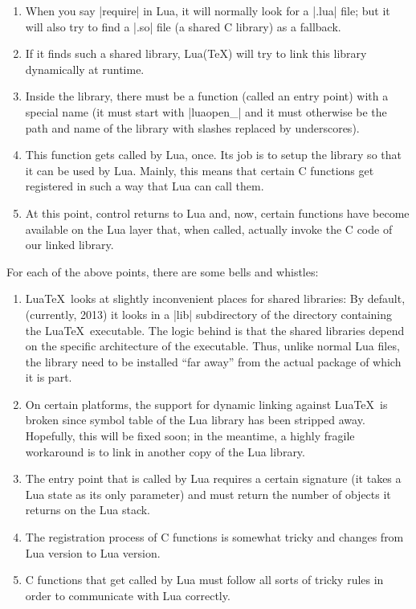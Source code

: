 \begin{enumerate}
\item When you say |require| in Lua, it will normally look for a
  |.lua| file; but it will also try to find a |.so| file (a shared C
  library) as a fallback.
\item If it finds such a shared library, Lua(\TeX) will try to link
  this library dynamically at runtime.
\item Inside the library, there must be a function (called an entry
  point) with a special name (it must start with |luaopen_| and it
  must otherwise be the path and name of the library with slashes replaced by
  underscores).
\item This function gets called by Lua, once. Its job is to setup the
  library so that it can be used by Lua. Mainly, this means that
  certain C functions get registered in such a way that Lua can call
  them.
\item At this point, control returns to Lua and, now, certain
  functions have become available on the Lua layer that, when called,
  actually invoke the C code of our linked library.
\end{enumerate}

For each of the above points, there are some bells and whistles:

\begin{enumerate}
\item Lua\TeX\ looks at slightly inconvenient places for shared
  libraries: By default, (currently, 2013) it looks in a |lib|
  subdirectory of the directory containing the Lua\TeX\
  executable. The logic behind is that the shared libraries depend on
  the specific architecture of the executable. Thus, unlike normal Lua
  files, the library need to be installed ``far away'' from the actual
  package of which it is part.
\item On certain platforms, the support for dynamic linking against
  Lua\TeX\ is broken since symbol table of the Lua library has been
  stripped away. Hopefully, this will be fixed soon; in the meantime, a
  highly fragile workaround is to link in another copy of the Lua
  library.
\item The entry point that is called by Lua requires a certain
  signature (it takes a Lua state as its only parameter) and must
  return the number of objects it returns on the Lua stack.
\item The registration process of C functions is somewhat tricky and
  changes from Lua version to Lua version.
\item C functions that get called by Lua must follow all sorts of
  tricky rules in order to communicate with Lua correctly.
\end{enumerate}

